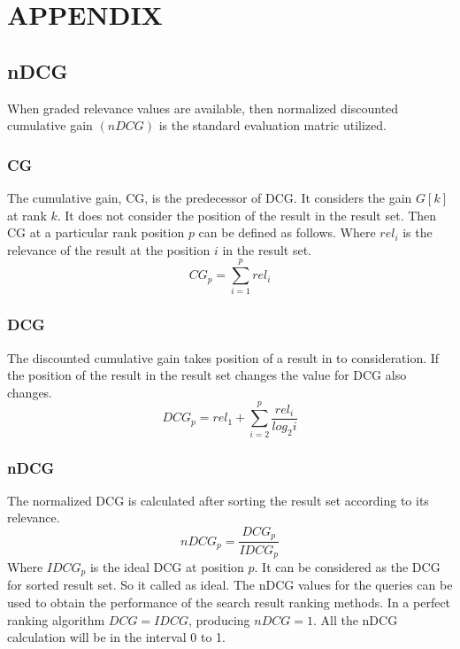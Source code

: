 
\titlespacing*{\chapter}{0pt}{-30pt}{10pt}

\chapter*{\fontsize{16}{12}\selectfont APPENDIX}\label{publications}
  \label{page:publications}

\section*{nDCG}
When graded relevance values are available, then normalized discounted cumulative gain $(nDCG)$ is the standard evaluation matric utilized.
\subsection*{CG} 
The cumulative gain, CG, is the predecessor of DCG. It considers the gain $G[k]$ at rank $k$. It does not consider the position of the result in the result set. Then CG at a particular rank position $p$ can be defined as follows. Where  $rel_{i}$ is the relevance of the result at the position $i$ in the result set.
\begin{equation}
CG_{p}=\sum^{p} _{i=1} rel_{i}
\end{equation}

\subsection*{DCG}
The discounted cumulative gain takes position of a result in to consideration. If the position of the result in the result set changes the value for DCG also changes.
\begin{equation}
DCG_{p}=rel_{1} + \sum^{p}_{i=2} \frac{rel_{i}}{log_{2}i}
\end{equation}
\subsection*{nDCG}
The normalized DCG is calculated after sorting the result set according to its relevance.
 \begin{equation}
 nDCG_{p}=\frac{DCG_{p}}{IDCG_{p}}
 \end{equation}
 Where $IDCG_{p}$ is the ideal DCG at position $p$. It can be considered as the DCG for sorted result set. So it called as ideal. The nDCG values for the queries can be used to obtain the performance of the search result ranking methods. In a perfect ranking algorithm $DCG=IDCG$, producing $nDCG=1$. All the nDCG calculation will be in the interval 0 to 1.